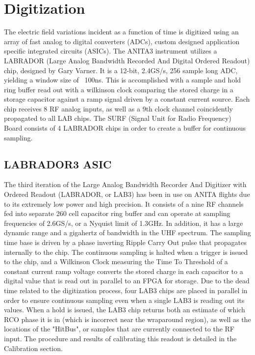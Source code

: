 	
\section{Digitization}
	The electric field variations incident as a function of time is digitized using an array of fast analog to digital converters (ADCs), custom designed application specific integrated circuits (ASICs).  The ANITA3 instrument utilizes a LABRADOR (Large Analog Bandwidth Recorded And Digital Ordered Readout) chip, designed by Gary Varner.  It is a 12-bit, 2.4GS/s, 256 sample long ADC, yielding a window size of ~100ns.  This is accomplished with a sample and hold ring buffer read out with a wilkinson clock comparing the stored charge in a storage capacitor against a ramp signal driven by a constant current source.  Each chip receives 8 RF analog inputs, as well as a 9th clock channel coincidently propagated to all LAB chips.  The SURF (Signal Unit for Radio Frequency) Board consists of 4 LABRADOR chips in order to create a buffer for continuous sampling.  

	\subsection{LABRADOR3 ASIC}
		The third iteration of the Large Analog Bandwidth Recorder And Digitizer with Ordered Readout (LABRADOR, or LAB3) has been in use on ANITA flights due to its extremely low power and high precision.  It consists of a nine RF channels fed into separate 260 cell capacitor ring buffer and can operate at sampling frequencies of 2.6GS/s, or a Nyquist limit of 1.3GHz.  In addition, it has a large dynamic range and a gigahertz of bandwidth in the UHF spectrum.  The sampling time base is driven by a phase inverting Ripple Carry Out pulse that propagates internally to the chip.  The continuous sampling is halted when a trigger is issued to the chip, and a Wilkinson Clock measuring the Time To Threshold of a constant current ramp voltage converts the stored charge in each capacitor to a digital value that is read out in parallel to an FPGA for storage.  Due to the dead time related to the digitization process, four LAB3 chips are placed in parallel in order to ensure continuous sampling even when a single LAB3 is reading out its values.  When a hold is issued, the LAB3 chip returns both an estimate of which RCO phase it is in (which is incorrect near the wraparound region), as well as the locations of the "HitBus", or samples that are currently connected to the RF input. The procedure and results of calibrating this readout is detailed in the Calibration section.
		
